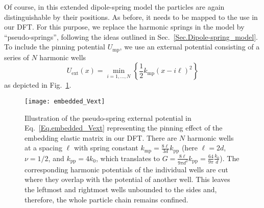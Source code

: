 \documentclass[aps,pre,twocolumn,superscriptaddress,nofootinbib]{revtex4}
\begin{document}
Of course, in this extended dipole-spring model the particles are again distinguishable by their positions. 
As before, it needs to be mapped to the use in our DFT. 
For this purpose, we replace the harmonic springs in the model by ``pseudo-springs'', following the ideas outlined in Sec.~\ref{Sec.Dipole-spring_model}. 
To include the pinning potential $U_\textrm{mp}$, we use an external potential consisting of a series of $N$ harmonic wells 
%
\begin{equation}
	U_\textrm{ext}(x) = \min_{i = 1, \dots, N} \left\lbrace \frac{1}{2} k_\textrm{mp} (x - i\ell)^2  \right\rbrace
	\label{Eq.embedded_Vext}
\end{equation}
%
as depicted in Fig.~\ref{Fig.embedded_Vext}.
%
\begin{figure}
	\texttt{[image: embedded\_Vext]}
	\caption{Illustration of the pseudo-spring external potential in Eq.~\eqref{Eq.embedded_Vext} representing the pinning effect of the embedding elastic matrix in our DFT. There are $N$ harmonic wells at a spacing $\ell$ with spring constant $k_\textrm{mp} = \frac{8\ell}{3d} k_\textrm{pp}$  (here $\ell = 2d$, $\nu = 1/2$, and  $k_\textrm{pp} = 4 k_0$, which translates to $G = \frac{8\ell}{9 \pi d^2} k_\textrm{pp} = \frac{64}{9\pi} \frac{k_0}{d}$). The corresponding harmonic potentials of the individual wells are cut where they overlap with the potential of another well. This leaves the leftmost and rightmost wells unbounded to the sides and, therefore, the whole particle chain remains confined.}
	\label{Fig.embedded_Vext}
\end{figure}
\end{document}
